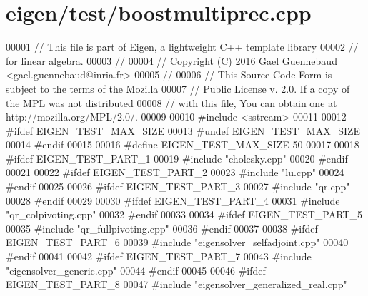 \hypertarget{eigen_2test_2boostmultiprec_8cpp_source}{}\section{eigen/test/boostmultiprec.cpp}
\label{eigen_2test_2boostmultiprec_8cpp_source}

\begin{DoxyCode}
00001 \textcolor{comment}{// This file is part of Eigen, a lightweight C++ template library}
00002 \textcolor{comment}{// for linear algebra.}
00003 \textcolor{comment}{//}
00004 \textcolor{comment}{// Copyright (C) 2016 Gael Guennebaud <gael.guennebaud@inria.fr>}
00005 \textcolor{comment}{//}
00006 \textcolor{comment}{// This Source Code Form is subject to the terms of the Mozilla}
00007 \textcolor{comment}{// Public License v. 2.0. If a copy of the MPL was not distributed}
00008 \textcolor{comment}{// with this file, You can obtain one at http://mozilla.org/MPL/2.0/.}
00009 
00010 \textcolor{preprocessor}{#include <sstream>}
00011 
00012 \textcolor{preprocessor}{#ifdef EIGEN\_TEST\_MAX\_SIZE}
00013 \textcolor{preprocessor}{#undef EIGEN\_TEST\_MAX\_SIZE}
00014 \textcolor{preprocessor}{#endif}
00015 
00016 \textcolor{preprocessor}{#define EIGEN\_TEST\_MAX\_SIZE 50}
00017 
00018 \textcolor{preprocessor}{#ifdef EIGEN\_TEST\_PART\_1}
00019 \textcolor{preprocessor}{#include "cholesky.cpp"}
00020 \textcolor{preprocessor}{#endif}
00021 
00022 \textcolor{preprocessor}{#ifdef EIGEN\_TEST\_PART\_2}
00023 \textcolor{preprocessor}{#include "lu.cpp"}
00024 \textcolor{preprocessor}{#endif}
00025 
00026 \textcolor{preprocessor}{#ifdef EIGEN\_TEST\_PART\_3}
00027 \textcolor{preprocessor}{#include "qr.cpp"}
00028 \textcolor{preprocessor}{#endif}
00029 
00030 \textcolor{preprocessor}{#ifdef EIGEN\_TEST\_PART\_4}
00031 \textcolor{preprocessor}{#include "qr\_colpivoting.cpp"}
00032 \textcolor{preprocessor}{#endif}
00033 
00034 \textcolor{preprocessor}{#ifdef EIGEN\_TEST\_PART\_5}
00035 \textcolor{preprocessor}{#include "qr\_fullpivoting.cpp"}
00036 \textcolor{preprocessor}{#endif}
00037 
00038 \textcolor{preprocessor}{#ifdef EIGEN\_TEST\_PART\_6}
00039 \textcolor{preprocessor}{#include "eigensolver\_selfadjoint.cpp"}
00040 \textcolor{preprocessor}{#endif}
00041 
00042 \textcolor{preprocessor}{#ifdef EIGEN\_TEST\_PART\_7}
00043 \textcolor{preprocessor}{#include "eigensolver\_generic.cpp"}
00044 \textcolor{preprocessor}{#endif}
00045 
00046 \textcolor{preprocessor}{#ifdef EIGEN\_TEST\_PART\_8}
00047 \textcolor{preprocessor}{#include "eigensolver\_generalized\_real.cpp"}

\end{DoxyCode}
